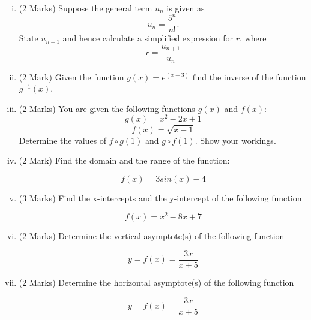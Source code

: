 \documentclass[11pt]{article} %
\begin{document}
\begin{enumerate}[(i)]
	\item (2 Marks) Suppose the general term $u_n$ is given as \[u_n = \displaystyle{\frac{5^n}{n!} } .\]State $u_{n+1}$ and hence calculate a simplified expression for $r$, where 
	{
		\Large
		\[ r = \frac{u_{n+1}}{u_n}\]
	}
\vspace{8.8cm}

	\item (2 Mark) Given the function $g(x) = e^{(x-3)}$ find the inverse of the function $g^{-1}(x)$.

\newpage

	\item (2 Marks) You are given the following functions $g(x)$ and $f(x)$:
	\[g(x)= x^2 - 2x  +1\]    \[f(x) = \sqrt{x-1}\] Determine the values of $f \circ g(1)$ and $g \circ f(1)$. Show your workings.	
	
	\newpage
		
\item (2 Mark) Find the domain and the range of the function:

\[ f(x) = 3 sin(x)  - 4 \]
	
	\vspace{8.8cm}
	
	

	\item (3 Marks) Find the x-intercepts and the y-intercept of the following function

\[ f(x) = x^2 - 8x + 7  \]

	\newpage
	
	\item (2 Marks) Determine the vertical asymptote(s) of the following function


\[ y = f(x) = \frac{3x}{x+5} \]	

\vspace{5.8cm}
	
	\item (2 Marks) Determine the horizontal asymptote(s) of the following function
	
\[ y = f(x) = \frac{3x}{x+5} \]	
	
\end{enumerate}
\end{document}
